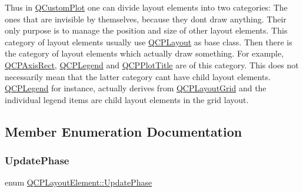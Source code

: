 Thus in \hyperlink{class_q_custom_plot}{Q\+Custom\+Plot} one can divide layout elements into two categories\+: The ones that are invisible by themselves, because they don\textquotesingle{}t draw anything. Their only purpose is to manage the position and size of other layout elements. This category of layout elements usually use \hyperlink{class_q_c_p_layout}{Q\+C\+P\+Layout} as base class. Then there is the category of layout elements which actually draw something. For example, \hyperlink{class_q_c_p_axis_rect}{Q\+C\+P\+Axis\+Rect}, \hyperlink{class_q_c_p_legend}{Q\+C\+P\+Legend} and \hyperlink{class_q_c_p_plot_title}{Q\+C\+P\+Plot\+Title} are of this category. This does not necessarily mean that the latter category can\textquotesingle{}t have child layout elements. \hyperlink{class_q_c_p_legend}{Q\+C\+P\+Legend} for instance, actually derives from \hyperlink{class_q_c_p_layout_grid}{Q\+C\+P\+Layout\+Grid} and the individual legend items are child layout elements in the grid layout. 

\subsection{Member Enumeration Documentation}
\hypertarget{class_q_c_p_layout_element_a0d83360e05735735aaf6d7983c56374d}{}\label{class_q_c_p_layout_element_a0d83360e05735735aaf6d7983c56374d} 
\subsubsection{\texorpdfstring{Update\+Phase}{UpdatePhase}}
{\footnotesize\ttfamily enum \hyperlink{class_q_c_p_layout_element_a0d83360e05735735aaf6d7983c56374d}{Q\+C\+P\+Layout\+Element\+::\+Update\+Phase}}

